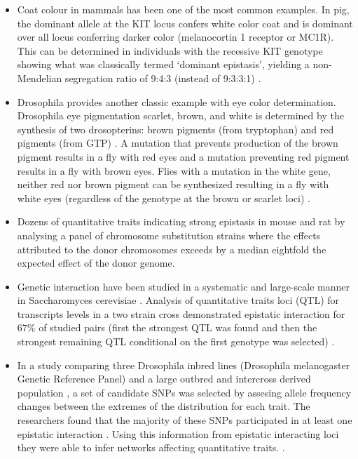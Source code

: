 \begin{itemize}

	\item Coat colour in mammals has been one of the most common examples. 
In pig, the dominant allele at the KIT locus confers white color coat and is dominant over all locus conferring darker color (melanocortin 1 receptor or MC1R). 
This can be determined in individuals with the recessive KIT genotype showing what was classically termed `dominant epistasis', 
yielding a non-Mendelian segregation ratio of 9:4:3 (instead of 9:3:3:1) \cite{carlborg2004epistasis, phillips2008epistasis}.

	\item Drosophila provides another classic example with eye color determination.
Drosophila eye pigmentation scarlet, brown, and white is determined by the synthesis of two drosopterins:  brown pigments (from tryptophan) and red pigments (from GTP) \cite{tyler2009shadows}.
A mutation that prevents production of the brown pigment results in a fly with red eyes and a mutation preventing red pigment results in a fly with brown eyes.
Flies with a mutation in the white gene, neither red nor brown pigment can be synthesized resulting in a fly with white eyes (regardless of the genotype at the brown or scarlet loci) \cite{tyler2009shadows}.

	\item Dozens of quantitative traits indicating strong epistasis in mouse and rat \cite{shao2008genetic} by analysing a panel of chromosome substitution strains where the effects attributed to the donor chromosomes exceeds by a median eightfold the expected effect of the donor genome.

	\item Genetic interaction have been studied in a systematic and large-scale manner in Saccharomyces cerevisiae \cite{jasnos2007epistatic,tong2001systematic}.
Analysis of quantitative traits loci (QTL) for transcripts levels in a two strain cross demonstrated epistatic interaction for $67\%$ of studied pairs (first the strongest QTL was found and then the strongest remaining QTL conditional on the first genotype was selected) \cite{brem2005genetic}. 

	\item In a study comparing three Drosophila inbred lines (Drosophila melanogaster Genetic Reference Panel) and a large outbred and intercross derived  population \cite{huang2012epistasis}, a set of candidate SNPs was selected by assesing allele frequency changes between the extremes of the distribution for each trait. 
The researchers found that the majority of these SNPs participated in at least one epistatic interaction \cite{huang2012epistasis}.
Using this information from epistatic interacting loci they were able to infer networks affecting quantitative traits. \cite{huang2012epistasis}.

\end{itemize}

